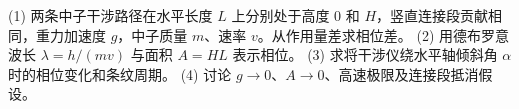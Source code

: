 (1) 两条中子干涉路径在水平长度 \(L\) 上分别处于高度 \(0\) 和 \(H\)，竖直连接段贡献相同，重力加速度 \(g\)，中子质量 \(m\)、速率 \(v\)。从作用量差求相位差。
(2) 用德布罗意波长 \(\lambda=h/(mv)\) 与面积 \(A=HL\) 表示相位。
(3) 求将干涉仪绕水平轴倾斜角 \(\alpha\) 时的相位变化和条纹周期。
(4) 讨论 \(g\to0\)、\(A\to0\)、高速极限及连接段抵消假设。
